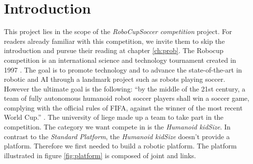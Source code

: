 \documentclass[12pt,a4paper]{report}
\begin{document}
\chapter{Introduction}
\label{ch:intro}
This project lies in the scope of the \emph{RoboCupSoccer competition} project. For readers already familiar with this competition, we invite them to skip the introduction and pursue their reading at chapter \ref{ch:prob}.\newline
The Robocup competition is an international science and technology tournament created in 1997 \cite{robocupHistory}. The goal is to promote technology and to advance the state-of-the-art in robotic and AI through a landmark project such as robots playing soccer. However the ultimate goal is the following: \newline ``by the middle of the 21st century, a team of fully autonomous humanoid robot soccer players shall win a soccer game, complying with the official rules of FIFA, against the winner of the most recent World Cup.'' \cite{RobocupObjective}.\newline
The university of liege made up a team to take part in the competition. The category we want compete in is the \emph{Humanoid kidSize}. In contrast to the \emph{Standard Platform}, the \emph{Humanoid kidSize} doesn't provide a platform. Therefore we first needed to build a robotic platform. The platform illustrated in figure \ref{fig:platform} is composed of joint and links. 
\end{document}

